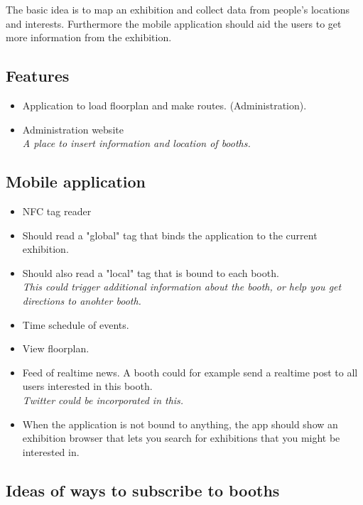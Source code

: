 The basic idea is to map an exhibition and collect data from people's locations and interests. Furthermore the mobile application should aid the users to get more information from the exhibition.


\subsection*{Features}

\begin{itemize}
\item Application to load floorplan and make routes. (Administration).

\item Administration website\\
\textit{A place to insert information and location of booths.}
\end{itemize}

\subsection*{Mobile application}

\begin{itemize}
\item NFC tag reader

\item Should read a "global" tag that binds the application to the current exhibition.

\item Should also read a "local" tag that is bound to each booth.\\
\textit{This could trigger additional information about the booth, or help you get directions to anohter booth.}
\item Time schedule of events.

\item View floorplan.

\item Feed of realtime news. A booth could for example send a realtime post to all users interested in this booth.\\
\textit{Twitter could be incorporated in this.}

\item When the application is not bound to anything, the app should show an exhibition browser that lets you search for exhibitions that you might be interested in.
\end{itemize}

\subsection*{Ideas of ways to subscribe to booths}

